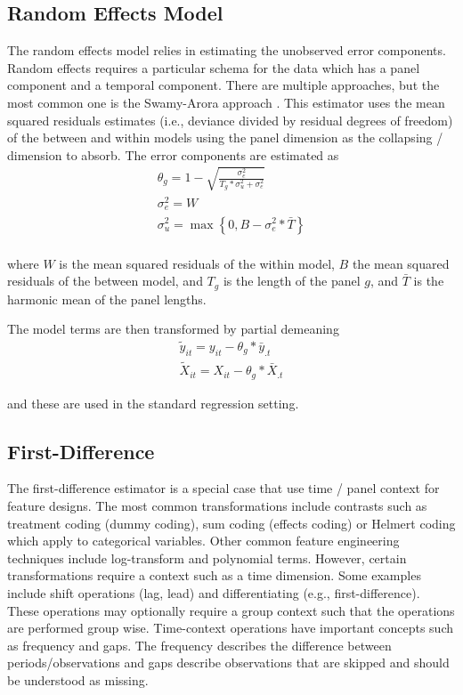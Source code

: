 \documentclass{juliacon}
\begin{document}
\subsection{Random Effects Model}

The random effects model relies in estimating the unobserved error components. Random effects requires a particular schema for the data which has a panel component and a temporal component. There are multiple approaches, but the most common one is the Swamy-Arora approach \cite{SwamyArora}. This estimator uses the mean squared residuals estimates (i.e., deviance divided by residual degrees of freedom) of the between and within models using the panel dimension as the collapsing / dimension to absorb. The error components are estimated as
\begin{equation}
\begin{split}
	\theta_{g} = 1 - \sqrt{\frac{\sigma_{e}^{2}}{T_{g} * \sigma_{u}^{2} + \sigma_{e}^{2}}} \\
	\sigma_{e}^{2} = W \\
	\sigma_{u}^{2} = \max\left\{0, B - \sigma_{e}^{2} * \bar{T}\right\} \\
\end{split}
\end{equation}

where $W$ is the mean squared residuals of the within model, $B$ the mean squared residuals of the between model, and $T_{g}$ is the length of the panel $g$, and $\bar{T}$ is the harmonic mean of the panel lengths.

The model terms are then transformed by partial demeaning
\begin{equation}
\begin{split}
\tilde{y}_{it} = y_{it} - \theta_{g} * \bar{y}_{.t} \\
\tilde{X}_{it} = X_{it} - \theta_{g} * \bar{X}_{.t}
\end{split}
\end{equation}

and these are used in the standard regression setting.

\subsection{First-Difference}

The first-difference estimator is a special case that use time / panel context for feature designs. The most common transformations include contrasts such as treatment coding (dummy coding), sum coding (effects coding) or Helmert coding which apply to categorical variables. Other common feature engineering techniques include log-transform and polynomial terms. However, certain transformations require a context such as a time dimension. Some examples include shift operations (lag, lead) and differentiating (e.g., first-difference). These operations may optionally require a group context such that the operations are performed group wise. Time-context operations have important concepts such as frequency and gaps. The frequency describes the difference between periods/observations and gaps describe observations that are skipped and should be understood as missing.
\end{document}
